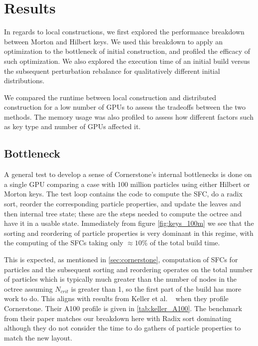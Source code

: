 \section{Results}
\label{sec:results}

In regards to local constructions, we first explored the performance breakdown between Morton and Hilbert keys. We used this breakdown to apply an optimization to the bottleneck of initial construction, and profiled the efficacy of such optimization. We also explored the execution time of an initial build versus the subsequent perturbation rebalance for qualitatively different initial distributions.

We compared the runtime between local construction and distributed construction for a low number of GPUs to assess the tradeoffs between the two methods. The memory usage was also profiled to assess how different factors such as key type and number of GPUs affected it.

\subsection{Bottleneck}

A general test to develop a sense of Cornerstone’s internal bottlenecks is done on a single GPU comparing a case with 100 million particles using either Hilbert or Morton keys. The test loop contains the code to compute the SFC, do a radix sort, reorder the corresponding particle properties, and update the leaves and then internal tree state; these are the steps needed to compute the octree and have it in a usable state. Immediately from figure \ref{fig:keys_100m} we see that the sorting and reordering of particle properties is very dominant in this regime, with the computing of the SFCs taking only $\approx 10\%$ of the total build time.

This is expected, as mentioned in \ref{sec:cornerstone}, computation of SFCs for particles and the subsequent sorting and reordering operates on the total number of particles which is typically much greater than the number of nodes in the octree assuming $N_{crit}$ is greater than 1, so the first part of the build has more work to do. This aligns with results from Keller et al. ~\cite{cornerstone} when they profile Cornerstone. Their A100 profile is given in \ref{tab:keller_A100}. The benchmark from their paper matches our breakdown here with Radix sort dominating although they do not consider the time to do gathers of particle properties to match the new layout.

